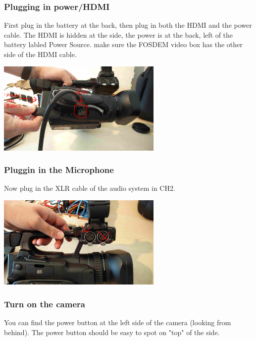 \documentclass{article}
\begin{document}
\subsubsection{Plugging in power/HDMI}
First plug in the battery at the back, then plug in both the HDMI and the power cable. The HDMI is hidden at the side, the power is at the back, left of the battery labled Power Source. make sure the FOSDEM video box has the other side of the HDMI cable.

\includegraphics[width = 80mm]{Canon01.jpg}

\subsubsection{Pluggin in the Microphone}
Now plug in the XLR cable of the audio system in CH2.

\includegraphics[width = 80mm]{Canon02.jpg}

\subsubsection{Turn on the camera}
You can find the power button at the left side of the camera (looking from behind). The power button should be easy to spot on "top" of the side.
\end{document}
